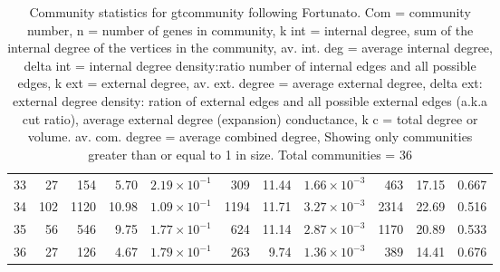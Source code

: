 \begin{table}[ht]
\begin{adjustbox}{width=\textwidth}
\begin{tabular}{lrrrrrrrrrr}
  33 & 27 & 154 & 5.70 & $2.19 \times 10^{-1}$ & 309 & 11.44 & $1.66 \times 10^{-3}$ & 463 & 17.15 & 0.667 \\ 
  34 & 102 & 1120 & 10.98 & $1.09 \times 10^{-1}$ & 1194 & 11.71 & $3.27 \times 10^{-3}$ & 2314 & 22.69 & 0.516 \\ 
  35 & 56 & 546 & 9.75 & $1.77 \times 10^{-1}$ & 624 & 11.14 & $2.87 \times 10^{-3}$ & 1170 & 20.89 & 0.533 \\ 
  36 & 27 & 126 & 4.67 & $1.79 \times 10^{-1}$ & 263 & 9.74 & $1.36 \times 10^{-3}$ & 389 & 14.41 & 0.676 \\ 
   \hline
\end{tabular}
\end{adjustbox}
\caption{Community statistics for gtcommunity following Fortunato. Com = community number, n = number of genes in community,
                  k int = internal degree, sum of the internal degree of the vertices in the community,
                  av. int. deg = average internal degree, 
                  delta int = internal degree density:ratio number of internal edges and all possible edges,
                  k ext = external degree, av. ext. degree = average external degree,
                  delta ext: external degree density: ration of external edges and all possible external edges (a.k.a cut ratio),
                  average external degree (expansion) conductance, k c = total degree or volume. av. com. degree = average combined degree, Showing only communities greater than or equal to 1 in size. Total communities = 36} 
                  
\label{tab:Community statistics for gtcommunity following Fortunato.}
\end{table}

